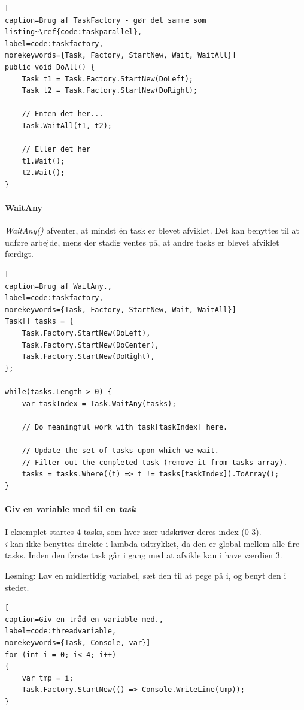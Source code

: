 \begin{lstlisting}[
caption=Brug af TaskFactory - gør det samme som listing~\ref{code:taskparallel},
label=code:taskfactory,
morekeywords={Task, Factory, StartNew, Wait, WaitAll}]
public void DoAll() {
	Task t1 = Task.Factory.StartNew(DoLeft);
	Task t2 = Task.Factory.StartNew(DoRight);
	
	// Enten det her...
	Task.WaitAll(t1, t2);
	
	// Eller det her
	t1.Wait();
	t2.Wait();
}
\end{lstlisting}

\paragraph{WaitAny}
\textit{WaitAny()} afventer, at mindst én task er blevet afviklet. Det kan benyttes til at udføre arbejde, mens der stadig ventes på, at andre tasks er blevet afviklet færdigt.

\begin{lstlisting}[
caption=Brug af WaitAny.,
label=code:taskfactory,
morekeywords={Task, Factory, StartNew, Wait, WaitAll}]
Task[] tasks = {
	Task.Factory.StartNew(DoLeft),
	Task.Factory.StartNew(DoCenter),
	Task.Factory.StartNew(DoRight),
};

while(tasks.Length > 0) {
	var taskIndex = Task.WaitAny(tasks);
	
	// Do meaningful work with task[taskIndex] here.
	
	// Update the set of tasks upon which we wait.
	// Filter out the completed task (remove it from tasks-array).
	tasks = tasks.Where((t) => t != tasks[taskIndex]).ToArray();
}
\end{lstlisting}

\paragraph{Giv en variable med til en \textit{task}}
I eksemplet startes 4 tasks, som hver især udskriver deres index (0-3).\\

\textit{i} kan ikke benyttes direkte i lambda-udtrykket, da den er global mellem alle fire tasks. Inden den første task går i gang med at afvikle kan i have værdien 3.

Løsning: Lav en midlertidig variabel, sæt den til at pege på i, og benyt den i stedet.

\begin{lstlisting}[
caption=Giv en tråd en variable med.,
label=code:threadvariable,
morekeywords={Task, Console, var}]
for (int i = 0; i< 4; i++)
{
	var tmp = i;
	Task.Factory.StartNew(() => Console.WriteLine(tmp));
}
\end{lstlisting}

